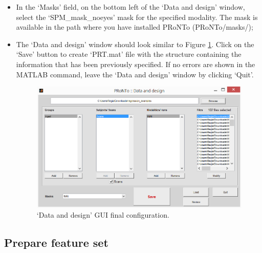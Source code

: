 \begin{itemize}
	 \item In the `Masks' field, on the bottom left of the `Data and design' window, select the `SPM\_mask\_noeyes' mask for the specified modality. The mask is available in the path where you have installed PRoNTo (PRoNTo/masks/);
    
     \item The `Data and design' window should look similar to Figure \ref{fig:dataDesignFinal}. Click on the `Save' button to create `PRT.mat' file with the structure containing the information that has been previously specified. If no errors are shown in the MATLAB command, leave the `Data and design' window by clicking `Quit'.
     
     \begin{figure}[h!]
            \begin{center}
                \includegraphics[scale=0.75]{images/Tutorial/regression/dataDesignFinal.png}
            \end{center}
            \caption{`Data and design' GUI final configuration.}
            \label{fig:dataDesignFinal}
        \end{figure}


\end{itemize}


\subsection{Prepare feature set}


